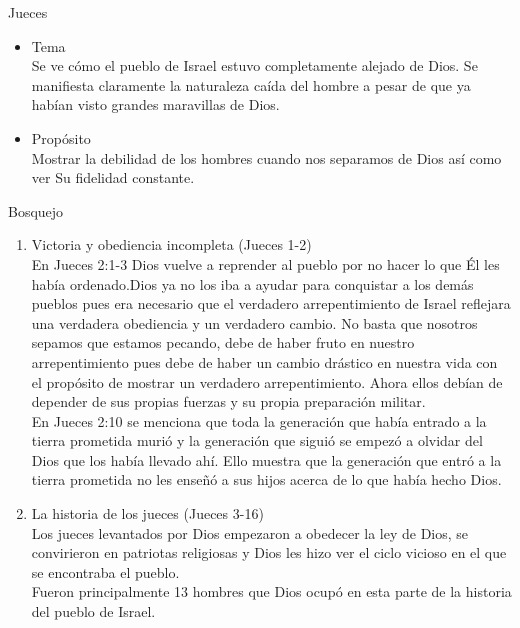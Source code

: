 \begin{section}{Jueces}
\begin{itemize}
				Por tradición judía y cristiana se le atribuye la autoría del libro a Samuel pero no hay seguridad en ello. Se escribe en tiempo pasado acerca del ``tiempo en el que no había reyes en Israel\ldots''\\
			Como contexto histórico se tiene en Jueces 1:21 que Jerusalén no era parte del pueblo de Israel. 
			\item Tema\\
				Se ve cómo el pueblo de Israel estuvo completamente alejado de Dios. Se manifiesta claramente la naturaleza caída del hombre a pesar de que ya habían visto grandes maravillas de Dios.
			\item Propósito\\
				Mostrar la debilidad de los hombres cuando nos separamos de Dios así como ver Su fidelidad constante.
		\end{itemize}
		\newpage
		\begin{subsection}{Bosquejo}
			\begin{enumerate}
				\item Victoria y obediencia incompleta (Jueces 1-2)\\
					En Jueces 2:1-3 Dios vuelve a reprender al pueblo por no hacer lo que Él les había ordenado.Dios ya no los iba a ayudar para conquistar a los demás pueblos pues era necesario que el verdadero arrepentimiento de Israel reflejara una verdadera obediencia y un verdadero cambio. No basta que nosotros sepamos que estamos pecando, debe de haber fruto en nuestro arrepentimiento pues debe de haber un cambio drástico en nuestra vida con el propósito de mostrar un verdadero arrepentimiento. Ahora ellos debían de depender de sus propias fuerzas y su propia preparación militar.\\
					En Jueces 2:10 se menciona que toda la generación que había entrado a la tierra prometida murió y la generación que siguió se empezó a olvidar del Dios que los había llevado ahí. Ello muestra que la generación que entró a la tierra prometida no les enseñó a sus hijos acerca de lo que había hecho Dios.
				\item La historia de los jueces (Jueces 3-16)\\
					Los jueces levantados por Dios empezaron a obedecer la ley de Dios, se convirieron en patriotas religiosas y Dios les hizo ver el ciclo vicioso en el que se encontraba el pueblo.\\
					Fueron principalmente 13 hombres que Dios ocupó en esta parte de la historia del pueblo de Israel.
					\begin{enumerate}

\end{enumerate}
\end{enumerate}
\end{subsection}
\end{section}
